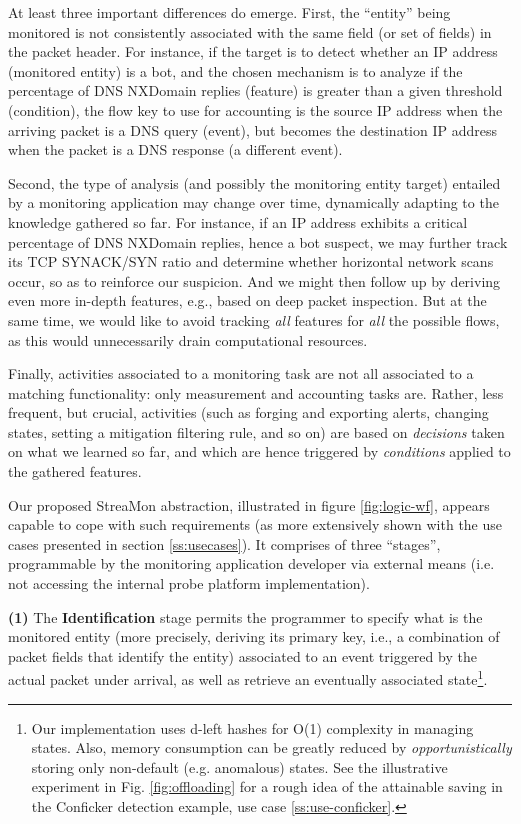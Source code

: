 \documentclass[conference,letterpaper]{sig-alternate-10pt}
\begin{document}
At least three important differences do emerge. First, the ``entity'' being monitored is not consistently associated with the same field (or set of fields) in the packet header. For instance, if the target is to detect whether an IP address (monitored entity) is a bot, and the chosen mechanism is to analyze if the percentage of DNS NXDomain replies (feature) is greater than a given threshold (condition), the flow key to use for accounting is the source IP address when the arriving packet is a DNS query (event), but becomes the destination IP address when the packet is a DNS response (a different event). 

Second, the type of analysis (and possibly the monitoring entity target) entailed by a monitoring application may change over time, dynamically adapting to the knowledge gathered so far. For instance, if an IP address exhibits a critical percentage of DNS NXDomain replies, hence a bot suspect, we may further track its TCP SYNACK/SYN ratio and determine whether horizontal network scans occur, so as to reinforce our suspicion. And we might then follow up by deriving even more in-depth features, e.g., based on deep packet inspection. But at the same time, we would like to avoid tracking {\em all} features for {\em all} the possible flows, as this would unnecessarily drain computational resources. 

Finally, activities associated to a monitoring task are not all associated to a matching functionality: only measurement and accounting tasks are. Rather, less frequent, but crucial, activities (such as forging and exporting alerts, changing states, setting a mitigation filtering rule, and so on) are based on {\em decisions} taken on what we learned so far, and which are hence triggered by {\em conditions} applied to the gathered features. 

Our proposed StreaMon abstraction, illustrated in figure \ref{fig:logic-wf}, appears capable to cope with such requirements (as more extensively shown with the use cases presented in section \ref{ss:usecases}). It comprises of three ``stages'', programmable by the monitoring application developer via external means (i.e. not accessing the internal probe platform implementation).

{\bf (1)} The {\bf Identification} stage permits the programmer to specify what is the monitored entity (more precisely, deriving its primary key, i.e., a combination of packet fields that identify the entity) associated to an event triggered by the actual packet under arrival, as well as retrieve an eventually associated state\footnote{
	Our implementation uses d-left hashes for O(1) complexity in managing states. Also, memory consumption 
	can be greatly reduced by {\em opportunistically} storing only non-default (e.g. anomalous) states. See the 
	illustrative experiment in Fig. \ref{fig:offloading} for a rough idea of the attainable saving in the Conficker 
	detection example, use case \ref{ss:use-conficker}.}.
\end{document}
